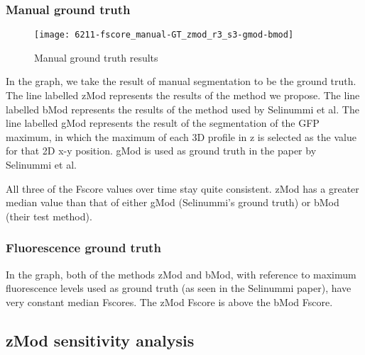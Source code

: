 \subsubsection{Manual ground truth}

\begin{figure}[htbp!]
\centering
\texttt{[image: 6211-fscore\_manual-GT\_zmod\_r3\_s3-gmod-bmod]}
\caption{Manual ground truth results}
\label{fig:manual_ground}
\end{figure}

In the graph, we take the result of manual segmentation to be the ground truth. The line labelled zMod represents the results of the method we propose. The line labelled bMod represents the results of the method used by Selinummi et al. The line labelled gMod represents the result of the segmentation of the GFP maximum, in which the maximum of each 3D profile in z is selected as the value for that 2D x-y position. gMod is used as ground truth in the paper by Selinummi et al.

All three of the Fscore values over time stay quite consistent. zMod has a greater median value than that of either gMod (Selinummi's ground truth) or bMod (their test method).

\subsubsection{Fluorescence ground truth}


In the graph, both of the methods zMod and bMod, with reference to maximum fluorescence levels used as ground truth (as seen in the Selinummi paper), have very constant median Fscores. The zMod Fscore is above the bMod Fscore.

\subsection{zMod sensitivity analysis}


